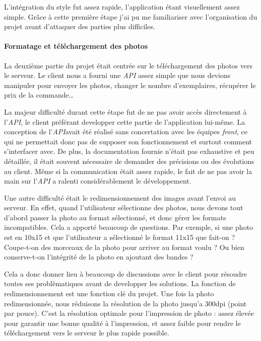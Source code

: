 \bigskip

L'intégration du style fut assez rapide, l'application étant
visuellement assez simple. Grâce à cette première étape j'ai pu me
familiariser avec l'organisation du projet avant d'attaquer des parties
plus difficiles.

\bigskip

\paragraph{Formatage et téléchargement des
photos}\label{formatage-et-tuxe9luxe9chargement-des-photos}

\bigskip

La deuxième partie du projet était centrée sur le téléchargement des
photos vers le serveur. Le client nous a fourni une \emph{API} assez
simple que nous devions manipuler pour envoyer les photos, changer le
nombre d'exemplaires, récupérer le prix de la commande\ldots{}

\bigskip

La majeur difficulté durant cette étape fut de ne pas avoir accès
directement à l'\emph{API}, le client préférant developper cette partie
de l'application lui-même. La conception de l'\emph{API}avait été
réalisé sans concertation avec les équipes \emph{front}, ce qui ne
permettait donc pas de supposer son fonctionnement et surtout comment
s'interfacer avec. De plus, la documentation fournie n'était pas
exhaustive et peu détaillée, il était souvent nécessaire de demander des
précisions ou des évolutions au client. Même si la communication était
assez rapide, le fait de ne pas avoir la main sur l'\emph{API} a ralenti
considérablement le développement.

\bigskip

Une autre difficulté était le redimensionnement des images avant l'envoi
au serveur. En effet, quand l'utilisateur sélectionne des photos, nous
devons tout d'abord passer la photo au format sélectionné, et donc gérer
les formats incompatibles. Cela a apporté beaucoup de questions. Par
exemple, si une photo est en 10x15 et que l'utilisateur a sélectionné le
format 11x15 que fait-on ? Coupe-t-on des morceaux de la photo pour
arriver au format voulu ? Ou bien conserve-t-on l'intégrité de la photo
en ajoutant des bandes ?

\bigskip

Cela a donc donner lieu à beaucoup de discussions avec le client pour
résoudre toutes ses problèmatiques avant de developper les solutions. La
fonction de redimensionnement est une fonction clé du projet. Une fois
la photo redimensionnée, nous réduisons la résolution de la photo
jusqu'a 300dpi (point par pouce). C'est la résolution optimale pour
l'impression de photo : assez élevée pour garantir une bonne qualité à
l'impression, et assez faible pour rendre le téléchargement vers le
serveur le plus rapide possible.

